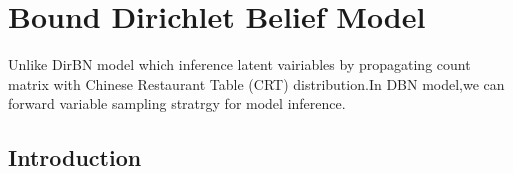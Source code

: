 \section{Bound Dirichlet Belief Model}
Unlike DirBN model which inference latent vairiables by propagating count matrix with Chinese Restaurant Table (CRT)
distribution.In DBN model,we can forward variable sampling stratrgy for model inference.
\subsection{Introduction}
